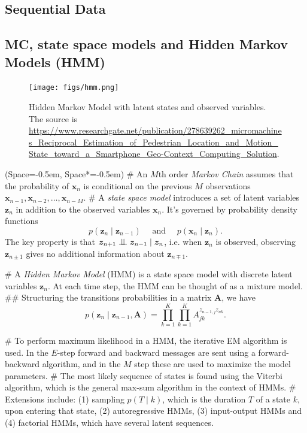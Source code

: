 \documentclass[12pt, a4paper]{article}
\newcommand{\listSpace}{-0.5em}%
\newcommand{\vect}[1]{\bm{#1}}
\newcommand{\bigCI}{\mathrel{\text{\scalebox{1.07}{$\perp\mkern-10mu\perp$}}}}
\begin{document}
\subsection{Sequential Data}


\subsection*{MC, state space models and Hidden Markov Models (HMM)}

		\begin{figure}[ht!]
			\centering
			\texttt{[image: figs/hmm.png]}
			\caption{Hidden Markov Model with latent states and observed variables.
				The source is \url{https://www.researchgate.net/publication/278639262_micromachines_Reciprocal_Estimation_of_Pedestrian_Location_and_Motion_State_toward_a_Smartphone_Geo-Context_Computing_Solution}.
				}
			\label{fig:hmm}
		\end{figure}
		
		
\begin{easylist}[itemize]
	\ListProperties(Space=\listSpace, Space*=\listSpace)
	# An $M$th order \emph{Markov Chain} assumes that the probability of $\vect{x}_n$ is conditional on the previous $M$ observations $\vect{x}_{n-1}, \vect{x}_{n-2}, \ldots, \vect{x}_{n-M}$.
	# A \emph{state space model} introduces a set of latent variables $\vect{z}_n$ in addition to the observed variables $\vect{x}_n$.
	It's governed by probability density functions
	\begin{equation*}
		p(\vect{z}_n \mid \vect{z}_{n-1}) 
		\quad \text{ and } \quad
		p(\vect{x}_n \mid \vect{z}_n).
	\end{equation*}
	The key property is that $\vect{z}_{n+1} \bigCI \vect{z}_{n-1} \mid \vect{z}_{n}$, i.e. when $\vect{z}_{n}$ is observed, observing $\vect{z}_{n\pm1}$ gives no additional information about $\vect{z}_{n\mp1}$.
	
	# A \emph{Hidden Markov Model} (HMM) is a state space model with discrete latent variables $\vect{z}_n$.
	At each time step, the HMM can be thought of as a mixture model.
	## Structuring the transitions probabilities in a matrix $\vect{A}$, we have
	\begin{equation*}
		p(\vect{z}_{n} \mid \vect{z}_{n-1}, \vect{A})
		=
		\prod_{k=1}^{K}
		\prod_{k=1}^{K}
		A_{jk}^{z_{n-1,j} z_{nk}}.
	\end{equation*}
	
	# To perform maximum likelihood in a HMM, the iterative EM algorithm is used.
	In the $E$-step forward and backward messages are sent using a forward-backward algorithm, and in the $M$ step these are used to maximize the model parameters.
	# The most likely sequence of states is found using the Viterbi algorithm, which is the general max-sum algorithm in the context of HMMs.
	# Extensions include:
	 (1) sampling $p(T \mid k)$, which is the duration $T$ of a state $k$, upon entering that state,
	 (2) autoregressive HMMs,
	 (3) input-output HMMs and
	 (4) factorial HMMs, which have several latent sequences.
	 
\end{easylist}
\end{document}
